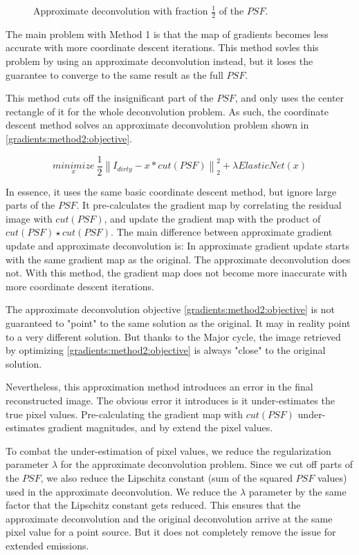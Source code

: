 \begin{figure}[h]
	\caption{Approximate deconvolution with fraction $\frac{1}{2}$ of the $PSF$.}
\end{figure} 
The main problem with Method 1 is that the map of gradients becomes less accurate with more coordinate descent iterations. This method sovles this problem by using an approximate deconvolution instead, but it loses the guarantee to converge to the same result as the full $PSF$.

This method cuts off the insignificant part of the $PSF$, and only uses the center rectangle of it for the whole deconvolution problem. As such, the coordinate descent method solves an approximate deconvolution problem shown in \eqref{gradients:method2:objective}.

\begin{equation}\label{gradients:method2:objective}
\underset{x}{minimize} \: \frac{1}{2} \left \| I_{dirty} - x * cut(PSF) \right \|_2^2 + \lambda ElasticNet(x)
\end{equation}

In essence, it uses the same basic coordinate descent method, but ignore large parts of the $PSF$. It pre-calculates the gradient map by correlating the residual image with $cut(PSF)$, and update the gradient map with the product of $cut(PSF) \star cut(PSF)$. The main difference between approximate gradient update and approximate deconvolution is: In approximate gradient update starts with the same gradient map as the original. The approximate deconvolution does not. With this method, the gradient map does not become more inaccurate with more coordinate descent iterations.

The approximate deconvolution objective \eqref{gradients:method2:objective} is not guaranteed to "point" to the same solution as the original. It may in reality point to a very different solution. But thanks to the Major cycle, the image retrieved by optimizing \eqref{gradients:method2:objective} is always "close" to the original solution.

Nevertheless, this approximation method introduces an error in the final reconstructed image. The obvious error it introduces is it under-estimates the true pixel values. Pre-calculating the gradient map with $cut(PSF)$ under-estimates gradient magnitudes, and by extend the pixel values.

To combat the under-estimation of pixel values, we reduce the regularization parameter $\lambda$ for the approximate deconvolution problem. Since we cut off parts of the $PSF$, we also reduce the Lipschitz constant (sum of the squared $PSF$ values) used in the approximate deconvolution. We reduce the $\lambda$ parameter by the same factor that the Lipschitz constant gets reduced. This ensures that the approximate deconvolution and the original deconvolution arrive at the same pixel value for a point source. But it does not completely remove the issue for extended emissions.

